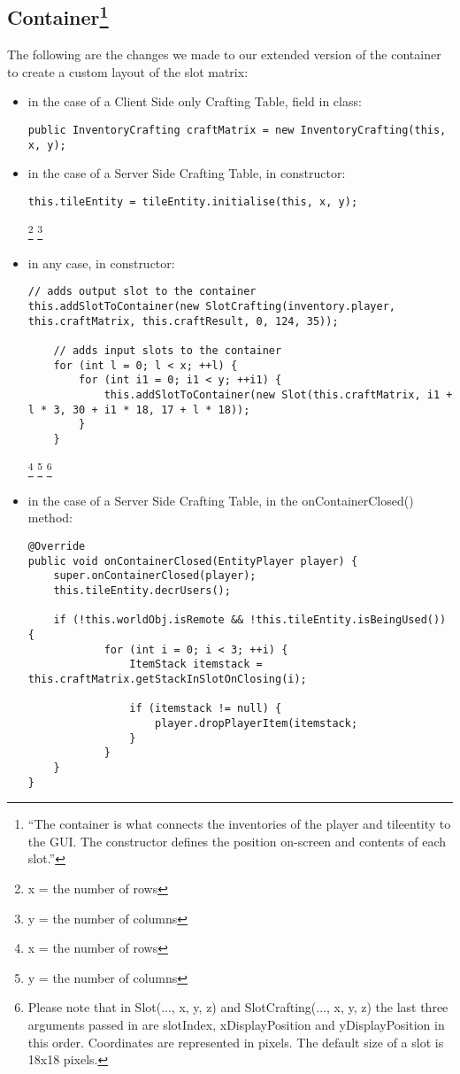 \subsection[Container]{Container\footnote{``The container is what connects the inventories of the player and tileentity to the GUI. The constructor defines the position on-screen and contents of each slot.''\cite{website:forge-container}}}
The following are the changes we made to our extended version of the container to create a custom layout of the slot matrix:
\begin{itemize}

\item in the case of a Client Side only Crafting Table, field in class:
\begin{lstlisting}
public InventoryCrafting craftMatrix = new InventoryCrafting(this, x, y);
\end{lstlisting}

\item in the case of a Server Side Crafting Table, in constructor:
\begin{lstlisting}
this.tileEntity = tileEntity.initialise(this, x, y);
\end{lstlisting}

\let\thefootnote\relax\footnote{x = the number of rows}
\let\thefootnote\relax\footnote{y = the number of columns}

\item in any case, in constructor:
\begin{lstlisting}
// adds output slot to the container
this.addSlotToContainer(new SlotCrafting(inventory.player,	this.craftMatrix, this.craftResult, 0, 124, 35));

	// adds input slots to the container
	for (int l = 0; l < x; ++l) {
		for (int i1 = 0; i1 < y; ++i1) {
			this.addSlotToContainer(new Slot(this.craftMatrix, i1 + l * 3, 30 + i1 * 18, 17 + l * 18));
		}
	}
\end{lstlisting}

\let\thefootnote\relax\footnote{x = the number of rows}
\let\thefootnote\relax\footnote{y = the number of columns}
\let\thefootnote\relax\footnote{Please note that in Slot(..., x, y, z) and SlotCrafting(..., x, y, z) the last three arguments passed in are slotIndex, xDisplayPosition and yDisplayPosition in this order. Coordinates are represented in pixels. The default size of a slot is 18x18 pixels.}

\item in the case of a Server Side Crafting Table, in the onContainerClosed() method:
\begin{lstlisting}
@Override
public void onContainerClosed(EntityPlayer player) {
	super.onContainerClosed(player);
	this.tileEntity.decrUsers();

	if (!this.worldObj.isRemote && !this.tileEntity.isBeingUsed()) {
			for (int i = 0; i < 3; ++i) {
				ItemStack itemstack = this.craftMatrix.getStackInSlotOnClosing(i);

				if (itemstack != null) {
					player.dropPlayerItem(itemstack;
				}
			}
	}
}
\end{lstlisting}
\end{itemize}

